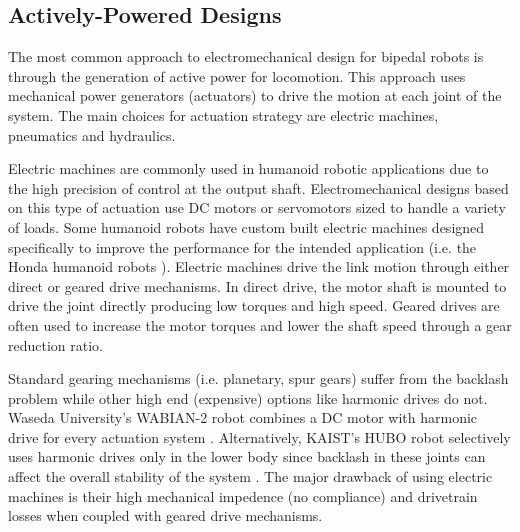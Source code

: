 

\subsection{Actively-Powered Designs} %
\label{sub:related_active_designs}
The most common approach to electromechanical design for bipedal robots is through the generation of active power for locomotion. This approach uses mechanical power generators (actuators) to drive the motion at each joint of the system. The main choices for actuation strategy are electric machines, pneumatics and hydraulics. 

Electric machines are commonly used in humanoid robotic applications due to the high precision of control at the output shaft. Electromechanical designs based on this type of actuation use DC motors or servomotors sized to handle a variety of loads. Some humanoid robots have custom built electric machines designed specifically to improve the performance for the intended application (i.e. the Honda humanoid robots \cite{Sakagami:2002cf,Hirai1998}). Electric machines drive the link motion through either direct or geared drive mechanisms. In direct drive, the motor shaft is mounted to drive the joint directly producing low torques and high speed. Geared drives are often used to increase the motor torques and lower the shaft speed through a gear reduction ratio.

Standard gearing mechanisms (i.e. planetary, spur gears) suffer from the backlash problem while other high end (expensive) options like harmonic drives do not. Waseda University's WABIAN-2 robot combines a DC motor with harmonic drive for every actuation system \cite{Ogura:2006bm}. Alternatively, KAIST's HUBO robot selectively uses harmonic drives only in the lower body since backlash in these joints can affect the overall stability of the system \cite{IllWooPark:2005et}. The major drawback of using electric machines is their high mechanical impedence (no compliance) and drivetrain losses when coupled with geared drive mechanisms.  








